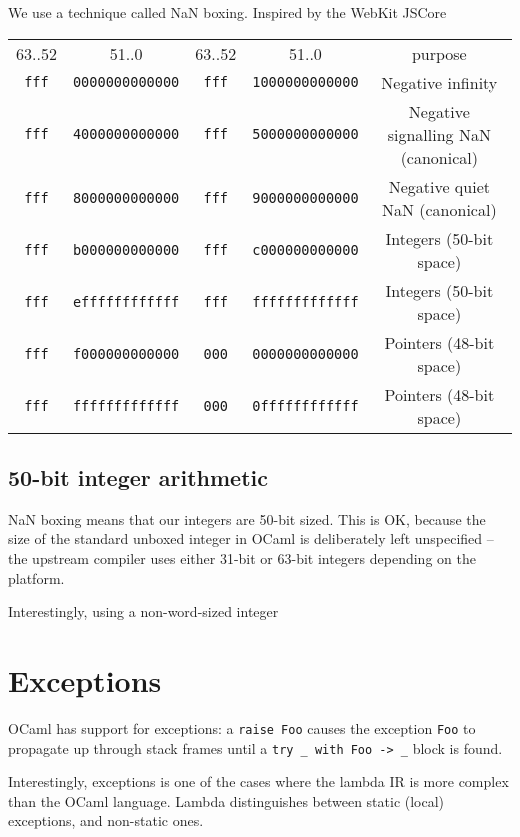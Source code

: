 \documentclass[12pt,a4paper,twoside,openright]{report}
\begin{document}
We use a technique called NaN boxing. Inspired by the WebKit JSCore

\begin{tabular}{c c | c c | c}
    63..52 & 51..0 & 63..52 & 51..0 & purpose \\
    \lstinline!fff! & \lstinline!0000000000000! & \lstinline!fff! & \lstinline!1000000000000! & Negative infinity \\
    \lstinline!fff! & \lstinline!4000000000000! & \lstinline!fff! & \lstinline!5000000000000! & Negative signalling NaN (canonical) \\
    \lstinline!fff! & \lstinline!8000000000000! & \lstinline!fff! & \lstinline!9000000000000! & Negative quiet NaN (canonical) \\
    \lstinline!fff! & \lstinline!b000000000000! & \lstinline!fff! & \lstinline!c000000000000! & Integers (50-bit space) \\
    \lstinline!fff! & \lstinline!effffffffffff! & \lstinline!fff! & \lstinline!fffffffffffff! & Integers (50-bit space) \\
    \lstinline!fff! & \lstinline!f000000000000! & \lstinline!000! & \lstinline!0000000000000! & Pointers (48-bit space) \\
    \lstinline!fff! & \lstinline!fffffffffffff! & \lstinline!000! & \lstinline!0ffffffffffff! & Pointers (48-bit space)
\end{tabular}

\subsection{50-bit integer arithmetic}\label{50-bit-integer}

NaN boxing means that our integers are 50-bit sized. This is OK, because the size of the standard unboxed integer in OCaml is deliberately left unspecified -- the upstream compiler uses either 31-bit or 63-bit integers depending on the platform.

Interestingly, using a non-word-sized integer

\section{Exceptions}\label{exceptions}

OCaml has support for exceptions: a \lstinline!raise Foo! causes the
exception \lstinline!Foo! to propagate up through stack frames until a
\lstinline!try _ with Foo -> _! block is found.

Interestingly, exceptions is one of the cases where the lambda IR is more
complex than the OCaml language. Lambda distinguishes between static (local)
exceptions, and non-static ones.
\end{document}
